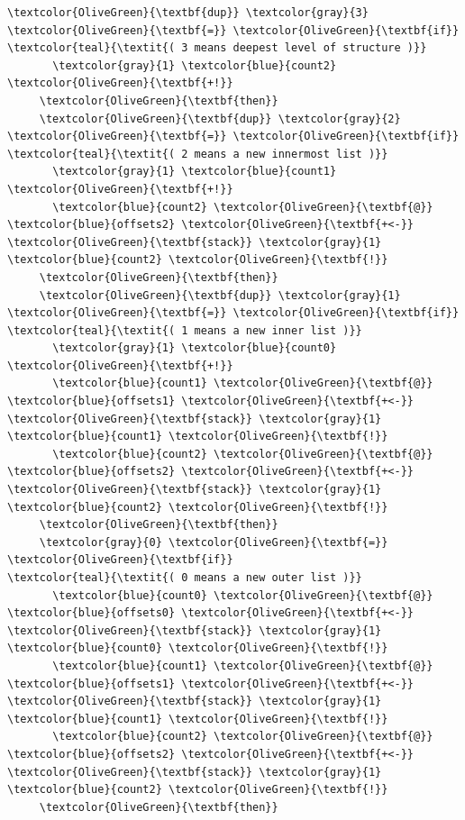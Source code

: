 \documentclass{webofc}
\begin{document}
\begin{Verbatim}[commandchars=\\\{\}]
     \textcolor{OliveGreen}{\textbf{dup}} \textcolor{gray}{3} \textcolor{OliveGreen}{\textbf{=}} \textcolor{OliveGreen}{\textbf{if}}                    \textcolor{teal}{\textit{( 3 means deepest level of structure )}}
       \textcolor{gray}{1} \textcolor{blue}{count2} \textcolor{OliveGreen}{\textbf{+!}}
     \textcolor{OliveGreen}{\textbf{then}}
     \textcolor{OliveGreen}{\textbf{dup}} \textcolor{gray}{2} \textcolor{OliveGreen}{\textbf{=}} \textcolor{OliveGreen}{\textbf{if}}                    \textcolor{teal}{\textit{( 2 means a new innermost list )}}
       \textcolor{gray}{1} \textcolor{blue}{count1} \textcolor{OliveGreen}{\textbf{+!}}
       \textcolor{blue}{count2} \textcolor{OliveGreen}{\textbf{@}} \textcolor{blue}{offsets2} \textcolor{OliveGreen}{\textbf{+<-}} \textcolor{OliveGreen}{\textbf{stack}} \textcolor{gray}{1} \textcolor{blue}{count2} \textcolor{OliveGreen}{\textbf{!}}
     \textcolor{OliveGreen}{\textbf{then}}
     \textcolor{OliveGreen}{\textbf{dup}} \textcolor{gray}{1} \textcolor{OliveGreen}{\textbf{=}} \textcolor{OliveGreen}{\textbf{if}}                    \textcolor{teal}{\textit{( 1 means a new inner list )}}
       \textcolor{gray}{1} \textcolor{blue}{count0} \textcolor{OliveGreen}{\textbf{+!}}
       \textcolor{blue}{count1} \textcolor{OliveGreen}{\textbf{@}} \textcolor{blue}{offsets1} \textcolor{OliveGreen}{\textbf{+<-}} \textcolor{OliveGreen}{\textbf{stack}} \textcolor{gray}{1} \textcolor{blue}{count1} \textcolor{OliveGreen}{\textbf{!}}
       \textcolor{blue}{count2} \textcolor{OliveGreen}{\textbf{@}} \textcolor{blue}{offsets2} \textcolor{OliveGreen}{\textbf{+<-}} \textcolor{OliveGreen}{\textbf{stack}} \textcolor{gray}{1} \textcolor{blue}{count2} \textcolor{OliveGreen}{\textbf{!}}
     \textcolor{OliveGreen}{\textbf{then}}
     \textcolor{gray}{0} \textcolor{OliveGreen}{\textbf{=}} \textcolor{OliveGreen}{\textbf{if}}                        \textcolor{teal}{\textit{( 0 means a new outer list )}}
       \textcolor{blue}{count0} \textcolor{OliveGreen}{\textbf{@}} \textcolor{blue}{offsets0} \textcolor{OliveGreen}{\textbf{+<-}} \textcolor{OliveGreen}{\textbf{stack}} \textcolor{gray}{1} \textcolor{blue}{count0} \textcolor{OliveGreen}{\textbf{!}}
       \textcolor{blue}{count1} \textcolor{OliveGreen}{\textbf{@}} \textcolor{blue}{offsets1} \textcolor{OliveGreen}{\textbf{+<-}} \textcolor{OliveGreen}{\textbf{stack}} \textcolor{gray}{1} \textcolor{blue}{count1} \textcolor{OliveGreen}{\textbf{!}}
       \textcolor{blue}{count2} \textcolor{OliveGreen}{\textbf{@}} \textcolor{blue}{offsets2} \textcolor{OliveGreen}{\textbf{+<-}} \textcolor{OliveGreen}{\textbf{stack}} \textcolor{gray}{1} \textcolor{blue}{count2} \textcolor{OliveGreen}{\textbf{!}}
     \textcolor{OliveGreen}{\textbf{then}}


\end{Verbatim}
\end{document}
